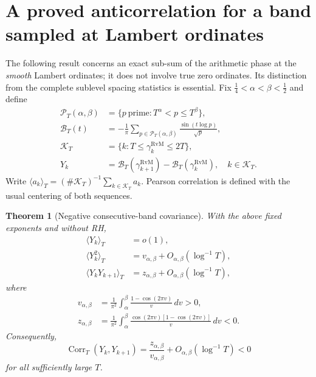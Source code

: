 \documentclass[11pt,leqno]{amsart}
\numberwithin{equation}{section}
\newtheorem{theorem}{Theorem}[section]
\theoremstyle{definition}
\theoremstyle{remark}
\newcommand{\1}{\mathbf 1}
\begin{document}
\section{A proved anticorrelation for a band sampled at Lambert ordinates}\label{sec:band}
The following result concerns an exact sub-sum of the arithmetic phase at the \emph{smooth} Lambert ordinates; it does not involve true zero ordinates. Its distinction from the complete sublevel spacing statistics is essential.
Fix $\frac14<\alpha<\beta<\frac12$ and define
\begin{align}
 \mathscr P_T(\alpha,\beta)&=\{p\ \text{prime}:T^\alpha<p\le T^\beta\},\label{eq:Pband}\\
 \mathscr B_T(t)&=-\frac1\pi\sum_{p\in\mathscr P_T(\alpha,\beta)}\frac{\sin(t\log p)}{\sqrt p},\label{eq:Bband}\\
 \mathscr K_T&=\{k:T\le\gamma_k^{\mathrm{RvM}}\le2T\},\\
 Y_k&=\mathscr B_T(\gamma_{k+1}^{\mathrm{RvM}})-\mathscr B_T(\gamma_k^{\mathrm{RvM}}),\quad k\in\mathscr K_T.\label{eq:band-Y}
\end{align}
Write $\langle a_k\rangle_T=(\#\mathscr K_T)^{-1}\sum_{k\in\mathscr K_T}a_k$. Pearson correlation is defined with the usual centering of both sequences.
\begin{theorem}[Negative consecutive-band covariance]\label{thm:band-cov}
With the above fixed exponents and without RH,
\begin{align}
 \langle Y_k\rangle_T&=o(1),\label{eq:band-mean}\\
 \langle Y_k^2\rangle_T&=v_{\alpha,\beta}+O_{\alpha,\beta}(\log^{-1}T),\label{eq:band-var}\\
 \langle Y_kY_{k+1}\rangle_T&=z_{\alpha,\beta}+O_{\alpha,\beta}(\log^{-1}T),\label{eq:band-covar}
\end{align}
where
\begin{align}
 v_{\alpha,\beta}&=\frac1{\pi^2}\int_\alpha^\beta\frac{1-\cos(2\pi v)}{v}\,dv>0,\\
 z_{\alpha,\beta}&=\frac1{\pi^2}\int_\alpha^\beta\frac{\cos(2\pi v)[1-\cos(2\pi v)]}{v}\,dv<0.
\end{align}
Consequently,
\begin{equation}\label{eq:band-corr}
 \boxed{\operatorname{Corr}_T(Y_k,Y_{k+1})=
 \frac{z_{\alpha,\beta}}{v_{\alpha,\beta}}+O_{\alpha,\beta}(\log^{-1}T)<0}
\end{equation}
for all sufficiently large $T$.
\end{theorem}
\end{document}
